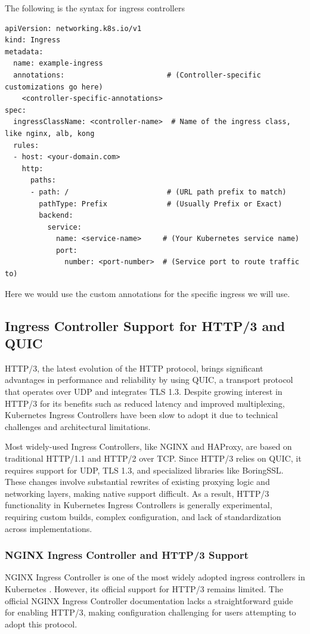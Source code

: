 The following is the syntax for ingress controllers
\begin{lstlisting}[breaklines=true,basicstyle=\small\ttfamily,frame=single]
apiVersion: networking.k8s.io/v1
kind: Ingress
metadata:
  name: example-ingress
  annotations:                        # (Controller-specific customizations go here)
    <controller-specific-annotations>
spec:
  ingressClassName: <controller-name>  # Name of the ingress class, like nginx, alb, kong
  rules:
  - host: <your-domain.com>
    http:
      paths:
      - path: /                       # (URL path prefix to match)
        pathType: Prefix              # (Usually Prefix or Exact)
        backend:
          service:
            name: <service-name>     # (Your Kubernetes service name)
            port:
              number: <port-number>  # (Service port to route traffic to)
\end{lstlisting}
Here we would use the custom annotations for the specific ingress we will use.


\subsection{Ingress Controller Support for HTTP/3 and QUIC}
HTTP/3, the latest evolution of the HTTP protocol, brings significant advantages in performance and reliability by using QUIC, a transport protocol that operates over UDP and integrates TLS 1.3. Despite growing interest in HTTP/3 for its benefits such as reduced latency and improved multiplexing, Kubernetes Ingress Controllers have been slow to adopt it due to technical challenges and architectural limitations.

Most widely-used Ingress Controllers, like NGINX and HAProxy, are based on traditional HTTP/1.1 and HTTP/2 over TCP. Since HTTP/3 relies on QUIC, it requires support for UDP, TLS 1.3, and specialized libraries like BoringSSL. These changes involve substantial rewrites of existing proxying logic and networking layers, making native support difficult. As a result, HTTP/3 functionality in Kubernetes Ingress Controllers is generally experimental, requiring custom builds, complex configuration, and lack of standardization across implementations.


\subsubsection{NGINX Ingress Controller and HTTP/3 Support}

NGINX Ingress Controller is one of the most widely adopted ingress controllers in Kubernetes \cite{nginx-ingress-docs}. However, its official support for HTTP/3 remains limited. The official NGINX Ingress Controller documentation lacks a straightforward guide for enabling HTTP/3, making configuration challenging for users attempting to adopt this protocol.

